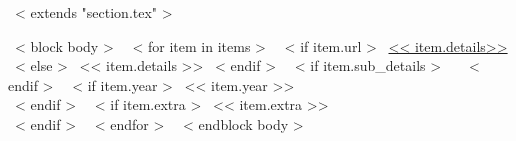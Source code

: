 ~< extends "section.tex" >~

~< block body >~
  ~< for item in items >~
    ~< if item.url >~
      \href{<< item.url >>}{<< item.details>>}
    ~< else >~
      << item.details >>
    ~< endif >~
    ~< if item.sub_details >~
      \,\, {\small
        \color{gray}{<< item.sub_details >>}
      }
    ~< endif >~
    ~< if item.year >~
        \hfill << item.year >> \\
    ~< endif >~
    ~< if item.extra >~
        << item.extra >> \\
    ~< endif >~
  ~< endfor >~
~< endblock body >~
